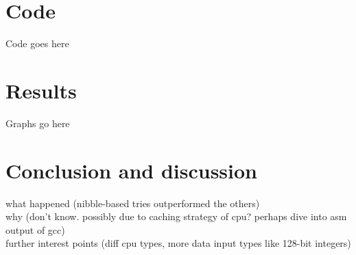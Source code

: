 \documentclass[11pt,onecolumn]{article}
\begin{document}
\newpage
\section{Code}
Code goes here


\newpage
\section{Results}
Graphs go here

\newpage
\section{Conclusion and discussion}
what happened (nibble-based tries outperformed the others)\\
why (don't know. possibly due to caching strategy of cpu? perhaps dive into asm output of gcc)\\
further interest points (diff cpu types, more data input types like 128-bit integers)\\
%
%
\end{document}
